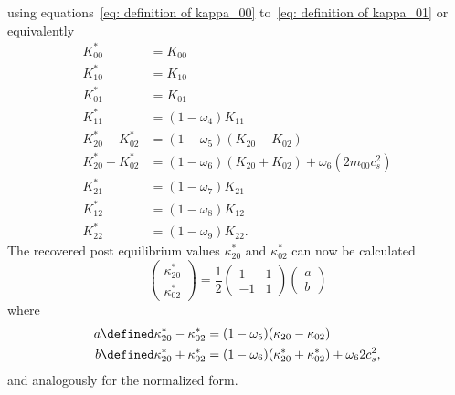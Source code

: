 using equations~\eqref{eq: definition of kappa_00} to~\eqref{eq: definition of kappa_01} or equivalently
\begin{equation}
  \label{eq: collision final before simplification normalized}
  \begin{aligned}
    K_{00}^{*} & = K_{00} \\
    K_{10}^{*} & = K_{10} \\
    K_{01}^{*} & = K_{01} \\
    K_{11}^{*} & = (1-\omega_4)K_{11} \\
    K_{20}^{*} - K_{02}^{*}
      & = (1-\omega_5) (K_{20} - K_{02}) \\
    K_{20}^{*} + K_{02}^{*}
      & = (1-\omega_6)(K_{20} + K_{02}) + \omega_6 \left( 2 m_{00} c_s^2 \right) \\
    K_{21}^{*} & = (1-\omega_7)K_{21} \\
    K_{12}^{*} & = (1-\omega_8)K_{12} \\
    K_{22}^{*} & = (1-\omega_9)K_{22}.
  \end{aligned}
\end{equation}
The recovered post equilibrium values $\kappa_{20}^{*}$ and $\kappa_{02}^{*}$ can now be calculated
\begin{equation}
  \begin{pmatrix}
    \kappa_{20}^{*} \\
    \kappa_{02}^{*}
  \end{pmatrix}
  = \frac{1}{2}
  \begin{pmatrix}
    1 & 1 \\ -1 & 1
  \end{pmatrix}
  \begin{pmatrix}
    a\\
    b
  \end{pmatrix}
\end{equation}
where
\begin{equation}
 \begin{aligned}
   a \defined \kappa_{20}^{*} - \kappa_{02}^{*}
     & = (1-\omega_5) (\kappa_{20} - \kappa_{02}) \\
   b \defined \kappa_{20}^{*} + \kappa_{02}^{*}
     & = (1-\omega_6)(\kappa_{20}^{*} + \kappa_{02}^{*}) + \omega_6 2 c_s^2,
 \end{aligned}
\end{equation}
and analogously for the normalized form.
